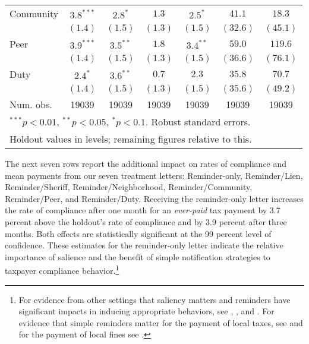\documentclass[12pt]{article}
\begin{document}
\begin{table}[htbp]
\begin{center}
\begin{tabular}{l c c c c c c }
Community    & $3.8^{***}$  & $2.8^{*}$    & $1.3$        & $2.5^{*}$    & $41.1$        & $18.3$        \\
             & $(1.4)$      & $(1.5)$      & $(1.3)$      & $(1.5)$      & $(32.6)$      & $(45.1)$      \\
Peer         & $3.9^{***}$  & $3.5^{**}$   & $1.8$        & $3.4^{**}$   & $59.0$        & $119.6$       \\
             & $(1.4)$      & $(1.5)$      & $(1.3)$      & $(1.5)$      & $(36.6)$      & $(76.1)$      \\
Duty         & $2.4^{*}$    & $3.6^{**}$   & $0.7$        & $2.3$        & $35.8$        & $70.7$        \\
             & $(1.4)$      & $(1.5)$      & $(1.3)$      & $(1.5)$      & $(35.6)$      & $(49.2)$      \\
\hline
Num. obs.    & 19039        & 19039        & 19039        & 19039        & 19039         & 19039         \\
\hline
\multicolumn{7}{l}{\scriptsize{$^{***}p<0.01$, $^{**}p<0.05$, $^*p<0.1$. Robust standard errors.}}  \\
\multicolumn{7}{l}{\scriptsize{Holdout values in levels; remaining figures relative to this.}}
\end{tabular}
\end{center}
\end{table}

The next seven rows report the additional impact on rates of
compliance and mean payments from our seven treatment letters: Reminder-only,
Reminder/Lien, Reminder/Sheriff, Reminder/Neighborhood,
Reminder/Community, Reminder/Peer, and Reminder/Duty.  Receiving the
reminder-only letter increases the rate of compliance after one month
for an \textit{ever-paid} tax payment by 3.7 percent above the
holdout's rate of compliance and by 3.9 percent after three months.
Both effects are statistically significant at the 99 percent level of
confidence.  These estimates for the reminder-only letter indicate the
relative importance of salience and the benefit of simple notification
strategies to taxpayer compliance behavior.\footnote{For evidence from
  other settings that saliency matters and reminders have significant
  impacts in inducing appropriate behaviors, see
  , , and
  . For evidence that simple reminders matter
  for the payment of local taxes, see  and for the
  payment of local fines see .}
\end{document}
